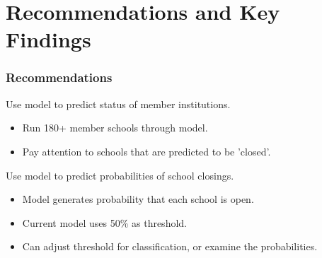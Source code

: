 \documentclass{beamer}
\begin{document}
\section{Recommendations and Key Findings} %
\begin{frame}
\frametitle{Recommendations}
\begin{block}{Use model to predict status of member institutions.}
\begin{itemize}
\item Run 180+ member schools through model.
\item Pay attention to schools that are predicted to be 'closed'.
\end{itemize}
\end{block}

\begin{block}{Use model to predict probabilities of school closings.}
\begin{itemize}
\item Model generates probability that each school is open.
\item Current model uses 50\% as threshold.
\item Can adjust threshold for classification, or examine the probabilities.
\end{itemize}
\end{block}
\end{frame}

\end{document}
